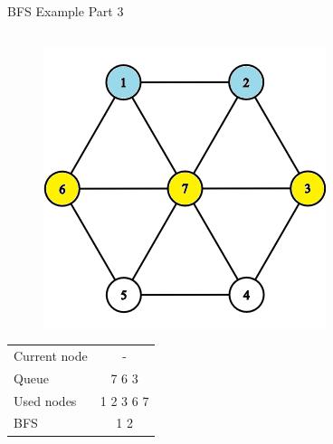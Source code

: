 \documentclass[aspectratio=169]{beamer}%
\begin{document}
\begin{frame}{BFS Example Part 3}
    \begin{columns}
        \begin{column}{0.32\textwidth}
            \begin{figure}[!ht]
                \centering
                \includegraphics[width=0.9\linewidth]{bfs 7.png}
            \end{figure}
            \begin{table}[ht]
                \centering
                \begin{tabular}{l c}
                    Current node & -\\
                    Queue & 7 6 3\\ 
                    Used nodes & 1 2 3 6 7\\
                    BFS & 1 2
                \end{tabular}
            \end{table}
        \end{column}
        \hfill
        \begin{column}{0.32\textwidth}
            \begin{figure}[!ht]
                \centering

\end{figure}
\end{column}
\end{columns}
\end{frame}
\end{document}

